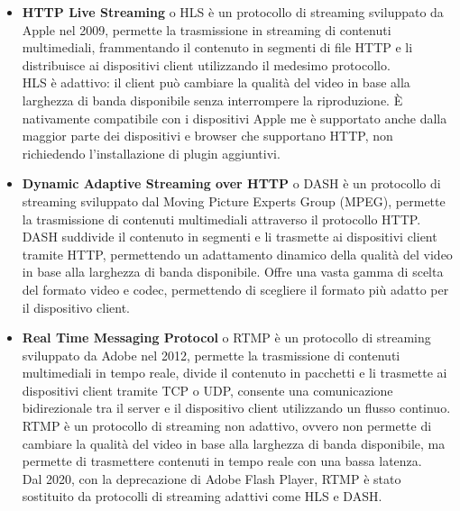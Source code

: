 \begin{itemize}

    \item \textbf{HTTP Live Streaming} o HLS è un protocollo di streaming sviluppato da Apple nel 2009, permette la trasmissione in streaming di contenuti multimediali,
    frammentando il contenuto in segmenti di file HTTP e li distribuisce ai dispositivi client utilizzando il medesimo protocollo.\\
    HLS è adattivo: il client può cambiare la qualità del video in base alla larghezza di banda disponibile senza interrompere la riproduzione.
    È nativamente compatibile con i dispositivi Apple me è supportato anche dalla maggior parte dei dispositivi e browser che supportano HTTP, non richiedendo l'installazione di plugin aggiuntivi.\\

    \item \textbf{Dynamic Adaptive Streaming over HTTP} o DASH è un protocollo di streaming sviluppato dal Moving Picture Experts Group (MPEG), permette la trasmissione di contenuti multimediali
    attraverso il protocollo HTTP.\\
    DASH suddivide il contenuto in segmenti e li trasmette ai dispositivi client tramite HTTP, permettendo un adattamento dinamico della qualità del video in base alla larghezza di banda disponibile.
    Offre una vasta gamma di scelta del formato video e codec, permettendo di scegliere il formato più adatto per il dispositivo client.\\

    \item \textbf{Real Time Messaging Protocol} o RTMP è un protocollo di streaming sviluppato da Adobe nel 2012, permette la trasmissione di contenuti multimediali in tempo reale,
    divide il contenuto in pacchetti e li trasmette ai dispositivi client tramite TCP o UDP, consente una comunicazione bidirezionale tra il server e il dispositivo client utilizzando un flusso continuo.\\
    RTMP è un protocollo di streaming non adattivo, ovvero non permette di cambiare la qualità del video in base alla larghezza di banda disponibile, ma permette di 
    trasmettere contenuti in tempo reale con una bassa latenza.\\
    Dal 2020, con la deprecazione di Adobe Flash Player, RTMP è stato sostituito da protocolli di streaming adattivi come HLS e DASH.\\
    \end{itemize}

